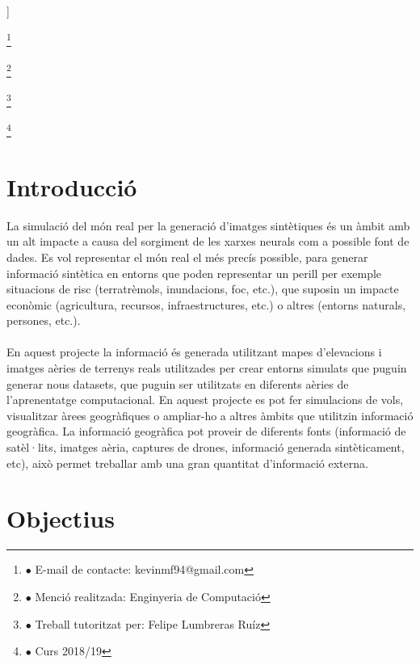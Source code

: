 \documentclass[10pt,a4paper,twocolumn,twoside]{article}
\newcommand\blfootnote[1]{%
  \begingroup
  \renewcommand\thefootnote{}\footnote{#1}%
  \addtocounter{footnote}{-1}%
  \endgroup
}
\begin{document}
\begin{@twocolumnfalse}
\begin{center}
\bigskip

{\vrule depth 0pt height 0.5pt width 4cm\hspace{7.5pt}%
%
\hspace{7.5pt}\vrule depth 0pt height 0.5pt width 4cm\relax}

\end{center}

\bigskip
\end{@twocolumnfalse}]

\blfootnote{$\bullet$ E-mail de contacte: kevinmf94@gmail.com}
\blfootnote{$\bullet$ Menció realitzada: Enginyeria de Computació}
\blfootnote{$\bullet$ Treball tutoritzat per: Felipe Lumbreras Ruíz}
\blfootnote{$\bullet$ Curs 2018/19}

\vspace{-1cm}
\section{Introducció}
La simulació del món real per la generació d'imatges sintètiques és un àmbit amb un alt impacte a causa del sorgiment de les xarxes neurals com a possible font de dades. Es vol representar el món real el més precís possible, para generar informació sintètica en entorns que poden representar un perill per exemple situacions de risc (terratrèmols, inundacions, foc, etc.), que suposin un impacte econòmic (agricultura, recursos, infraestructures, etc.) o altres (entorns naturals, persones, etc.).
\\
\\
En aquest projecte la informació és generada utilitzant mapes d'elevacions i imatges aèries de terrenys reals utilitzades per crear entorns simulats que puguin generar nous datasets, que puguin ser utilitzats en diferents aèries de l'aprenentatge computacional. En aquest projecte es pot fer simulacions de vols, visualitzar àrees geogràfiques o ampliar-ho a altres àmbits que utilitzin informació geogràfica. La informació geogràfica pot proveir de diferents fonts (informació de satèl·lits, imatges aèria, captures de drones, informació generada sintèticament, etc), això permet treballar amb una gran quantitat d'informació externa.

\section{Objectius}
\end{document}
